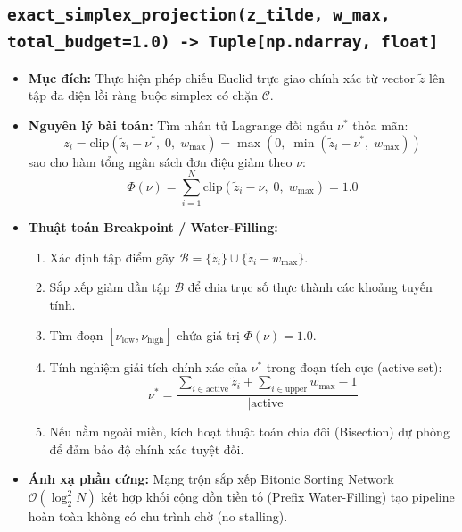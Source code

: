 \documentclass[12pt,a4paper]{article}
\begin{document}
\subsection{\texttt{exact\_simplex\_projection(z\_tilde, w\_max, total\_budget=1.0) -> Tuple[np.ndarray, float]}}
\begin{itemize}[leftmargin=1.5em]
    \item \textbf{Mục đích:} Thực hiện phép chiếu Euclid trực giao chính xác từ vector $\tilde{z}$ lên tập đa diện lồi ràng buộc simplex có chặn $\mathcal{C}$.
    \item \textbf{Nguyên lý bài toán:} Tìm nhân tử Lagrange đối ngẫu $\nu^*$ thỏa mãn:
    \begin{equation}
        z_i = \text{clip}(\tilde{z}_i - \nu^*, \; 0, \; w_{\max}) = \max(0, \; \min(\tilde{z}_i - \nu^*, \; w_{\max}))
    \end{equation}
    sao cho hàm tổng ngân sách đơn điệu giảm theo $\nu$:
    \begin{equation}
        \Phi(\nu) = \sum_{i=1}^N \text{clip}(\tilde{z}_i - \nu, \; 0, \; w_{\max}) = 1.0
    \end{equation}
    \item \textbf{Thuật toán Breakpoint / Water-Filling:}
    \begin{enumerate}
        \item Xác định tập điểm gãy $\mathcal{B} = \{ \tilde{z}_i \} \cup \{ \tilde{z}_i - w_{\max} \}$.
        \item Sắp xếp giảm dần tập $\mathcal{B}$ để chia trục số thực thành các khoảng tuyến tính.
        \item Tìm đoạn $[\nu_{\text{low}}, \nu_{\text{high}}]$ chứa giá trị $\Phi(\nu) = 1.0$.
        \item Tính nghiệm giải tích chính xác của $\nu^*$ trong đoạn tích cực (active set):
        \begin{equation}
            \nu^* = \frac{\sum_{i \in \text{active}} \tilde{z}_i + \sum_{i \in \text{upper}} w_{\max} - 1}{|\text{active}|}
        \end{equation}
        \item Nếu nằm ngoài miền, kích hoạt thuật toán chia đôi (Bisection) dự phòng để đảm bảo độ chính xác tuyệt đối.
    \end{enumerate}
    \item \textbf{Ánh xạ phần cứng:} Mạng trộn sắp xếp Bitonic Sorting Network $\mathcal{O}(\log_2^2 N)$ kết hợp khối cộng dồn tiền tố (Prefix Water-Filling) tạo pipeline hoàn toàn không có chu trình chờ (no stalling).
\end{itemize}
\end{document}
